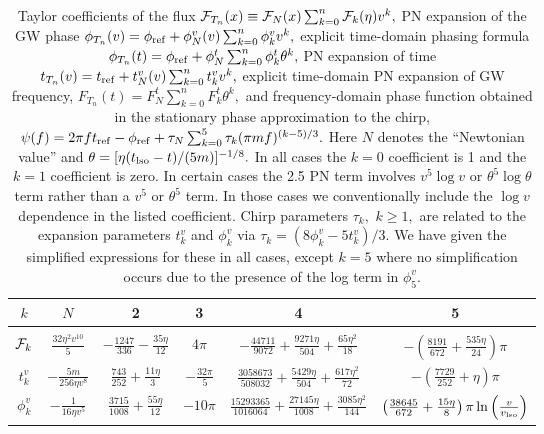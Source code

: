 \begin {table}[h]
\caption {Taylor coefficients of the flux
${\cal F}_{T_n}(x) \equiv {\cal F}_N(x) \sum_{k=0}^n {{\cal F}}_k(\eta)v^k,$
PN expansion of the GW phase
$\phi_{T_n}(v) =  \phi_{\rm ref} + \phi^v_N (v)\sum_{k=0}^{n} {\phi}^v_k v^k,$
explicit time-domain phasing formula
$\phi_{T_n}(t) = \phi_{\rm ref}+\phi_N^t \sum_{k=0}^{n}
{\phi}^t_k\theta^k,$
PN expansion of time $t_{T_n}(v) = t_{\rm ref} +t^v_N(v) \sum_{k=0}^{n} {t}^v_k v^k,$
explicit time-domain PN expansion of GW frequency,
$F_{T_n}(t) =  F_N^t \sum_{k=0}^{n} {F}^t_k \theta^k,$
and frequency-domain phase function obtained in the stationary phase approximation
to the chirp,
$\psi(f) = 2 \pi f t_{\rm ref} - \phi_{\rm ref} +
\tau_N \sum_{k=0}^5 {\tau}_k (\pi m f)^{(k-5)/3}.$
Here $N$ denotes the ``Newtonian value'' and
$\theta=[\eta (t_{\rm lso}-t)/(5m)]^{-1/8}.$ In all cases the $k=0$ coefficient
is 1 and the  $k=1$ coefficient is zero. In certain cases
the 2.5 PN term involves $v^5 \log v$ or $\theta^5 \log \theta$
 term rather than a  $v^5$ or $\theta^5$ term.
In those cases  we conventionally include the $\log v$ dependence in the
listed coefficient.
Chirp parameters $\tau_k,$ $k\ge 1,$
are related to the expansion parameters $t^v_k$ and $\phi^v_k$ via
$\tau_k = ( 8 \phi^v_k - 5 t^v_k )/3.$
We have given the simplified
expressions for these in all cases, except $k=5$ where no simplification occurs
due to the presence of the log term in $\phi^v_5.$}
\begin {center}
\begin {tabular}{cccccc}
\hline
$k$ &  $N$ & 2  &  3  &  4  &  5  \\
\hline\\[-8pt]
${\cal F}_k$
      & $\frac{32\eta^2 v^{10}}{5}$
      & $- \frac{1247}{336} - \frac{35\eta}{12}$
    & $4\pi$
    & $-\frac{44711}{9072} + \frac{9271\eta}{504} + \frac{65\eta^2}{18}$
    & $-\left(\frac{8191}{672} + \frac{535\eta}{24}\right) \pi$\\[3pt]
$t^v_k$
      & $-\frac{5m}{256 \eta v^8}$
      & $\frac{743}{252} + \frac{11\eta}{3}$
      & $-\frac{32\pi}{5}$
      & $\frac{3058673}{508032} + \frac{5429\eta}{504} + \frac{617\eta^2}{72}$
      & $-\left(\frac{7729}{252}+ \eta\right)\pi$\\[3pt]
$\phi^v_k$
      & $-\frac{1}{16\eta v^5}$
      & $\frac{3715}{1008}+\frac{55\eta}{12}$
      & $-10 \pi$
      & $\frac{15293365}{1016064} + \frac{27145\eta}{1008 } +
\frac{3085\eta^2}{144}$
      & $ \left (\frac{38645}{672} + \frac{15\eta}{8 } \right ) \pi
\ln \left ( \frac{v}{v_{\rm lso}} \right ) $\\[3pt]

\end{tabular}
\end{center}
\end{table}

